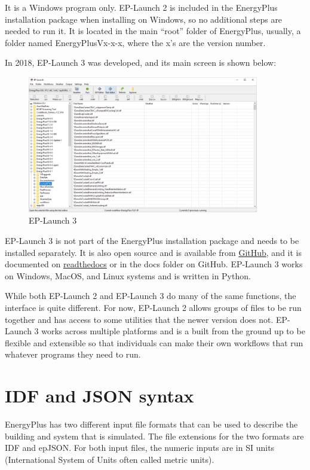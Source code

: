 It is a Windows program only. EP-Launch 2 is included in the EnergyPlus
installation package when installing on Windows, so no additional
steps are needed to run it. It is located in the main ``root'' folder
of EnergyPlus, usually, a folder named EnergyPlusVx-x-x, where the
x's are the version number.

In 2018, EP-Launch 3 was developed, and its main screen is shown below:

\begin{figure}[hbtp]
\centering
\includegraphics[width=0.9\textwidth, height=0.9\textheight, keepaspectratio=true]{media/eplaunch3.png}
\caption{EP-Launch 3}
\end{figure}


EP-Launch 3 is not part of the EnergyPlus installation package and
needs to be installed separately. It is also open source and is available
from \href{https://github.com/NREL/EP-Launch}{GitHub}, and it is
documented on \href{https://ep-launch.readthedocs.io/en/latest/}{readthedocs}
or in the docs folder on GitHub. EP-Launch 3 works on Windows, MacOS,
and Linux systems and is written in Python.

While both EP-Launch 2 and EP-Launch 3 do many of the same functions,
the interface is quite different. For now, EP-Launch 2 allows groups
of files to be run together and has access to some utilities that
the newer version does not. EP-Launch 3 works across multiple platforms
and is a built from the ground up to be flexible and extensible so
that individuals can make their own workflows that run whatever programs
they need to run.

\section{IDF and JSON syntax}

EnergyPlus has two different input file formats that can be used to
describe the building and system that is simulated. The file extensions
for the two formats are IDF and epJSON. For both input files, the
numeric inputs are in SI units (International System of Units often
called metric units).

